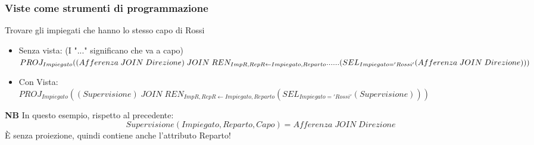 \documentclass[../main.tex]{subfiles}
\begin{document}
	\subsubsection{Viste come strumenti di programmazione}
	Trovare gli impiegati che hanno lo stesso capo di Rossi
	\begin{itemize}
		\item Senza vista: (I "..." significano che va a capo)\\
		$PROJ_{Impiegato} ((Afferenza \; JOIN \; Direzione) \; JOIN \; REN_{ImpR, RepR \leftarrow Impiegato, Reparto} ...\\... (SEL_{Impiegato = 'Rossi'} (Afferenza \; JOIN \; Direzione)))$
		\item Con Vista:\\
		$PROJ_{Impiegato} ((Supervisione) \; JOIN \; REN_{ImpR, RepR \leftarrow Impiegato, Reparto} (SEL_{Impiegato = 'Rossi'} (Supervisione)))$
	\end{itemize}
	\textbf{NB} In questo esempio, rispetto al precedente:
	\[Supervisione(Impiegato,Reparto,Capo)= Afferenza \; JOIN \;  Direzione\]
	È senza proiezione, quindi contiene anche l’attributo Reparto!
\end{document}
